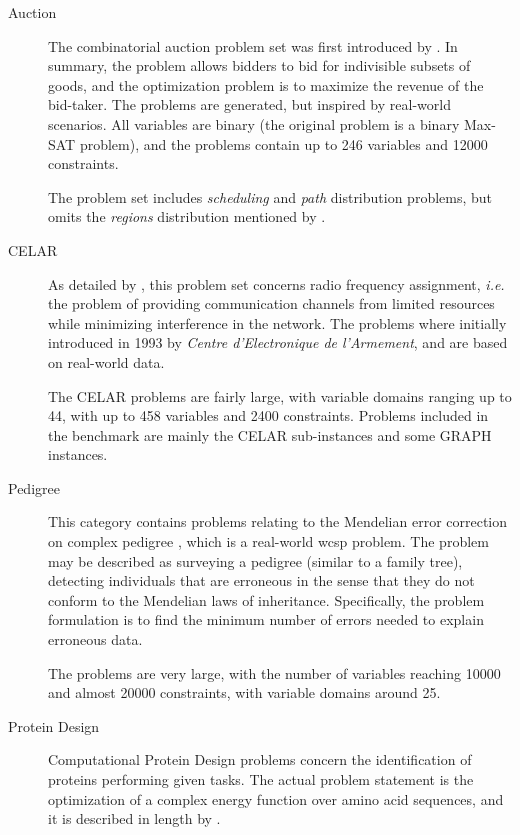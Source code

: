 \begin{description}
	\item[Auction]
		The combinatorial auction problem set was first introduced by \textcite{Larrosa08}.
		In summary, the problem allows bidders to bid for indivisible subsets of goods, and the optimization problem is to maximize the revenue of the bid-taker.
		The problems are generated, but inspired by real-world scenarios.
		All variables are binary (the original problem is a binary Max-SAT problem), and the problems contain up to \num{246} variables and \num{12000} constraints.

		The problem set includes \emph{scheduling} and \emph{path} distribution problems, but omits the \emph{regions} distribution mentioned by \textcite[\pno~228]{Larrosa08}.

	\item[CELAR]
		As detailed by \textcite{Cabon99}, this problem set concerns radio frequency assignment, \emph{i.e.} the problem of providing communication channels from limited resources while minimizing interference in the network.
		The problems where initially introduced in 1993 by \emph{Centre d’Electronique de l’Armement}, and are based on real-world data.

		The CELAR problems are fairly large, with variable domains ranging up to \num{44}, with up to \num{458} variables and \num{2400} constraints.
		Problems included in the benchmark are mainly the CELAR sub-instances \parencite[\pno~85]{Cabon99} and some GRAPH instances.

	\item[Pedigree]
		This category contains problems relating to the Mendelian error correction on complex pedigree \parencite{Sanchez08}, which is a real-world \gls{wcsp} problem.
		The problem may be described as surveying a pedigree (similar to a family tree), detecting individuals that are erroneous in the sense that they do not conform to the Mendelian laws of inheritance.
		Specifically, the problem formulation is to find the minimum number of errors needed to explain erroneous data.

		The problems are very large, with the number of variables reaching \num{10000} and almost \num{20000} constraints, with variable domains around \num{25}.

	\item[Protein Design]
		Computational Protein Design problems concern the identification of proteins performing given tasks. The actual problem statement is the optimization of a complex energy function over amino acid sequences, and it is described in length by \textcite{Allouche12}.


\end{description}

